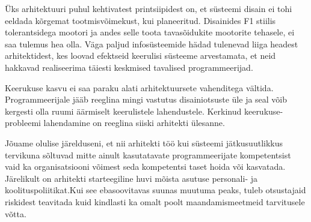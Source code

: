 Üks arhitektuuri puhul kehtivatest printsiipidest on, et süsteemi disain ei tohi eeldada kõrgemat tootmisvõimekust, kui planeeritud. Disainides F1 stiilis tolerantsidega mootori ja andes selle toota tavasõidukite mootorite tehasele, ei saa tulemus hea olla. Väga paljud infosüsteemide hädad tulenevad liiga headest arhitektidest, kes loovad efektseid keerulisi süsteeme arvestamata, et neid hakkavad realiseerima täiesti keskmised tavalised programmeerijad. 

Keerukuse kasvu ei saa paraku alati arhitektuursete vahenditega vältida. Programmeerijale jääb reeglina mingi vastutus disainiotsuste üle ja seal võib kergesti olla ruumi äärmiselt keerulistele lahendustele. Kerkinud keerukuse-probleemi lahendamine on reeglina siiski arhitekti ülesanne. 

Jõuame olulise järelduseni, et nii arhitekti töö kui süsteemi jätkusuutlikkus tervikuna sõltuvad mitte ainult kasutatavate programmeerijate kompetentsist vaid ka organisatsiooni võimest seda kompetentsi taset hoida või kasvatada. Järelikult on arhitekti starteegiline huvi mõista asutuse personali- ja koolituspoliitikat.Kui see ebasoovitavas suunas muutuma peaks, tuleb otsustajaid riskidest teavitada kuid kindlasti ka omalt poolt maandamismeetmeid tarvitusele võtta.


